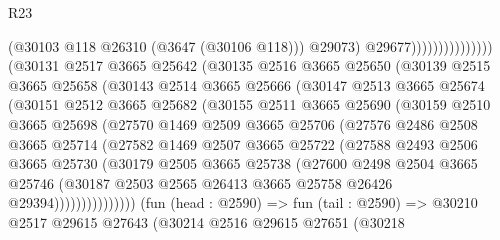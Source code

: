 \begin{lexlean}{R23}
\begin{coremodule}
                                        (@30103 @118 @26310 (@3647 (@30106 @118)))
                                        @29073)
                                      @29677)))))))))))))))
        (@30131
          @2517
          @3665
          @25642
          (@30135
            @2516
            @3665
            @25650
            (@30139
              @2515
              @3665
              @25658
              (@30143
                @2514
                @3665
                @25666
                (@30147
                  @2513
                  @3665
                  @25674
                  (@30151
                    @2512
                    @3665
                    @25682
                    (@30155
                      @2511
                      @3665
                      @25690
                      (@30159
                        @2510
                        @3665
                        @25698
                        (@27570
                          @1469
                          @2509
                          @3665
                          @25706
                          (@27576
                            @2486
                            @2508
                            @3665
                            @25714
                            (@27582
                              @1469
                              @2507
                              @3665
                              @25722
                              (@27588
                                @2493
                                @2506
                                @3665
                                @25730
                                (@30179
                                  @2505
                                  @3665
                                  @25738
                                  (@27600
                                    @2498
                                    @2504
                                    @3665
                                    @25746
                                    (@30187
                                      @2503
                                      @2565
                                      @26413
                                      @3665
                                      @25758
                                      @26426
                                      @29394)))))))))))))))
        (fun (head : @2590) =>
        fun (tail : @2590) =>
        @30210
          @2517
          @29615
          @27643
          (@30214
            @2516
            @29615
            @27651
            (@30218

\end{coremodule}
\end{lexlean}
